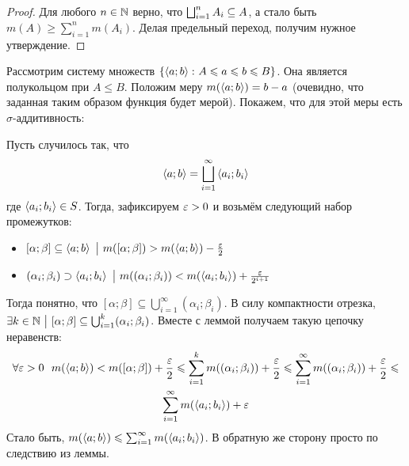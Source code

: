 \begin{proof}
	Для любого $n \in \mathbb{N}$ верно, что $\bigsqcup_{i = 1}^n A_i \subseteq A$, а стало быть $m(A) \ge \sum_{i = 1}^n m(A_i)$. Делая предельный переход, получим нужное утверждение.
\end{proof}

\begin{example}
	Рассмотрим систему множеств $\left\{\left\langle a; b\right\rangle \colon A \leqslant a \leqslant b \leqslant B\right\}$. Она является полукольцом при $A \le B$. Положим меру $m(\left\langle a; b\right\rangle) = b - a$ (очевидно, что заданная таким образом функция будет мерой). Покажем, что для этой меры есть $\sigma$-аддитивность:
	
	Пусть случилось так, что
	\[
		\left\langle a; b\right\rangle = \bigsqcup_{i = 1}^\infty \left\langle a_i; b_i\right\rangle
	\]
	где $\left\langle a_i; b_i\right\rangle \in S$. Тогда, зафиксируем $\varepsilon > 0$ и возьмём следующий набор промежутков:
	\begin{itemize}
		\item $[\alpha; \beta] \subseteq \left\langle a; b\right\rangle \ \big|\  m([\alpha; \beta]) > m(\left\langle a; b\right\rangle) - \frac{\varepsilon}{2}$
		
		\item $(\alpha_i; \beta_i) \supset \left\langle a_i; b_i\right\rangle \ \big|\  m((\alpha_i; \beta_i)) < m(\left\langle a_i; b_i\right\rangle) + \frac{\varepsilon}{2^{i + 1}}$
	\end{itemize}
	Тогда понятно, что $[\alpha; \beta] \subseteq \bigcup_{i = 1}^\infty (\alpha_i; \beta_i)$. В силу компактности отрезка, $\exists k \in \mathbb{N} \ \big|\  [\alpha; \beta] \subseteq \bigcup_{i = 1}^k (\alpha_i; \beta_i)$. Вместе с леммой получаем такую цепочку неравенств:
	\begin{multline*}
		\forall \varepsilon > 0\ \ m(\left\langle a; b\right\rangle) < m([\alpha; \beta]) + \frac{\varepsilon}{2} \leqslant \sum_{i = 1}^k m((\alpha_i; \beta_i)) + \frac{\varepsilon}{2} \leqslant \sum_{i = 1}^\infty m((\alpha_i; \beta_i)) + \frac{\varepsilon}{2} \leqslant
		\\
		\sum_{i = 1}^\infty m(\left\langle a_i; b_i\right\rangle) + \varepsilon
	\end{multline*}
	Стало быть, $m(\left\langle a; b\right\rangle) \leqslant \sum_{i = 1}^\infty m(\left\langle a_i; b_i\right\rangle)$. В обратную же сторону просто по следствию из леммы.
\end{example}